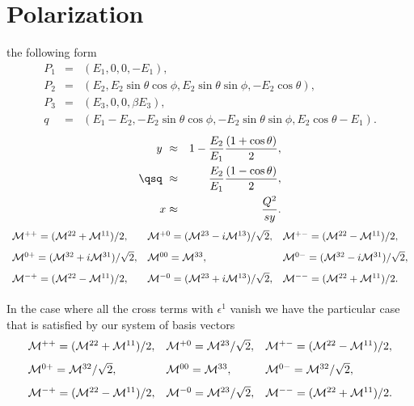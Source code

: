 \section{Polarization}
the following form
  \begin{eqnarray*}
   P_1 & = & (E_1,0,0,-E_1),      \\
   P_2 & = & (E_2,E_2\sin\theta\cos\phi,E_2\sin\theta\sin\phi,
               -E_2\cos\theta),   \\
   P_3 & = & (E_3,0,0,\beta E_3),      \\
   q   & = & (E_1 - E_2,-E_2\sin\theta\cos\phi,-E_2\sin\theta\sin\phi,
                    E_2\cos\theta - E_1).
  \end{eqnarray*}
  \begin{eqnarray*}
    y\     & \approx & 1 - {E_2\over E_1} {(1+\cos\theta)\over2}, \\
    \qsq \ & \approx & {E_2\over E_1}{(1-\cos\theta)\over2}, \\
    x      & \approx & {Q^2\over sy}.
  \end{eqnarray*}
\[ \begin{array}{lll} 
  {\cal M}^{++}=({\cal M}^{22} + {\cal M}^{11})/2, 
& {\cal M}^{+0}=({\cal M}^{23} -i{\cal M}^{13})/\sqrt{2},
& {\cal M}^{+-}=({\cal M}^{22} - {\cal M}^{11})/2, \\ [8pt]
  {\cal M}^{0+}=({\cal M}^{32} +i{\cal M}^{31})/\sqrt{2}, 
& {\cal M}^{00}= {\cal M}^{33}, 
& {\cal M}^{0-}=({\cal M}^{32} -i{\cal M}^{31})/\sqrt{2}, \\ [8pt]
  {\cal M}^{-+}=({\cal M}^{22} - {\cal M}^{11})/2, 
& {\cal M}^{-0}=({\cal M}^{23} +i{\cal M}^{13})/\sqrt{2}, 
& {\cal M}^{--}=({\cal M}^{22} + {\cal M}^{11})/2. \\ [8pt]
\end{array} \] In the case where all the cross terms with $\epsilon^1$
vanish we have the particular case that is satisfied by our system of 
basis vectors
\[ \begin{array}{lll} 
  {\cal M}^{++}=({\cal M}^{22} + {\cal M}^{11})/2, 
& {\cal M}^{+0}= {\cal M}^{23}/\sqrt{2},
& {\cal M}^{+-}=({\cal M}^{22} - {\cal M}^{11})/2, \\ [8pt]
  {\cal M}^{0+}= {\cal M}^{32}/\sqrt{2}, 
& {\cal M}^{00}= {\cal M}^{33}, 
& {\cal M}^{0-}= {\cal M}^{32}/\sqrt{2}, \\ [8pt]
  {\cal M}^{-+}=({\cal M}^{22} - {\cal M}^{11})/2, 
& {\cal M}^{-0}= {\cal M}^{23}/\sqrt{2}, 
& {\cal M}^{--}=({\cal M}^{22} + {\cal M}^{11})/2. 
\end{array} \]